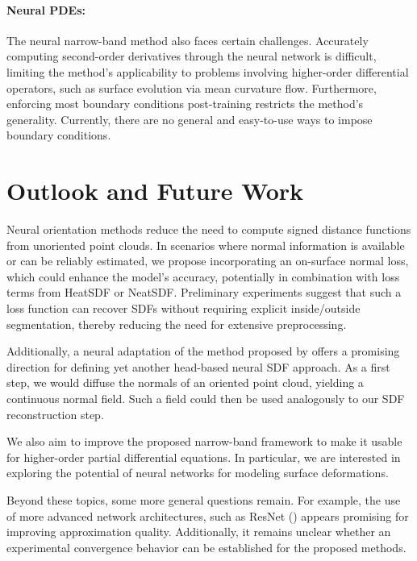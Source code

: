 \documentclass[12pt,openany]{book}
\theoremstyle{plainnormal}
\theoremstyle{remark}
\begin{document}
\paragraph{Neural PDEs:} The neural narrow-band method also faces certain challenges. Accurately computing second-order derivatives through the neural network is difficult, limiting the method's applicability to problems involving higher-order differential operators, such as surface evolution via mean curvature flow. Furthermore, enforcing most boundary conditions post-training restricts the method's generality. Currently, there are no general and easy-to-use ways to impose boundary conditions. 
\section{Outlook and Future Work}
Neural orientation methods reduce the need to compute signed distance functions from unoriented point clouds. In scenarios where normal information is available or can be reliably estimated, we propose incorporating an on-surface normal loss, which could enhance the model's accuracy, potentially in combination with loss terms from HeatSDF or NeatSDF. Preliminary experiments suggest that such a loss function can recover SDFs without requiring explicit inside/outside segmentation, thereby reducing the need for extensive preprocessing.\par
Additionally, a neural adaptation of the method proposed by \cite{FengCrane} offers a promising direction for defining yet another head-based neural SDF approach. As a first step, we would diffuse the normals of an oriented point cloud, yielding a continuous normal field. Such a field could then be used analogously to our SDF reconstruction step.\par
We also aim to improve the proposed narrow-band framework to make it usable for higher-order partial differential equations. In particular, we are interested in exploring the potential of neural networks for modeling surface deformations.\par
Beyond these topics, some more general questions remain. For example, the use of more advanced network architectures, such as ResNet (\cite{he2015deepresiduallearningimage}) appears promising for improving approximation quality. Additionally, it remains unclear whether an experimental convergence behavior can be established for the proposed methods.
\endgroup

\appendix
\end{document}
